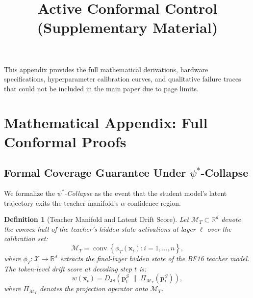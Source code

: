 \documentclass{uai2026}  %
\newtheorem{definition}{Definition}
\begin{document}
{\small

}

\newpage
\onecolumn
\title{Active Conformal Control\\(Supplementary Material)}
\maketitle

\appendix

\noindent This appendix provides the full mathematical derivations,
hardware specifications, hyperparameter calibration curves,
and qualitative failure traces that could not be included
in the main paper due to page limits.

\section{Mathematical Appendix: Full Conformal Proofs}
\label{app:proofs}

\subsection{Formal Coverage Guarantee Under \texorpdfstring{$\psi^*$}{psi*}-Collapse}

We formalize the \emph{$\psi^*$-Collapse} as the event that the student
model's latent trajectory exits the teacher manifold's $\alpha$-confidence region.

\begin{definition}[Teacher Manifold and Latent Drift Score]
Let $\mathcal{M}_T \subset \mathbb{R}^d$ denote the convex hull
of the teacher's hidden-state activations at layer $\ell$ over the
calibration set:
\begin{equation}
  \mathcal{M}_T = \operatorname{conv}\!\left\{
    \phi_T(\mathbf{x}_i) : i = 1,\ldots,n \right\},
\end{equation}
where $\phi_T : \mathcal{X} \to \mathbb{R}^{d}$ extracts the
final-layer hidden state of the BF16 teacher model.
The token-level drift score at decoding step $t$ is:
\begin{equation}
  w(\mathbf{x}_t) =
    D_\text{JS}\!\left(\mathbf{p}_t^S \;\|\;
    \Pi_{\mathcal{M}_T}(\mathbf{p}_t^S)\right),
\end{equation}
where $\Pi_{\mathcal{M}_T}$ denotes the projection operator onto
$\mathcal{M}_T$.
\end{definition}
\end{document}
